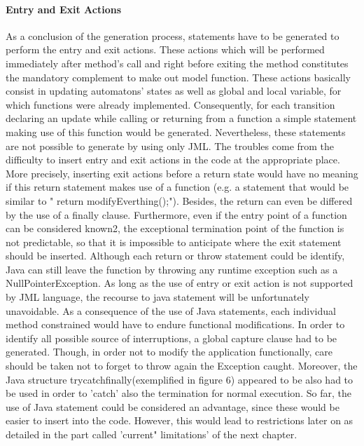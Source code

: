 \paragraph{Entry and Exit Actions}
As a conclusion of the generation process, statements have to be generated to perform the entry and exit actions. These actions which will be performed immediately after method's call and right before exiting the method constitutes the mandatory complement to make out model function. These actions basically consist in updating automatons' states as well as global and local variable, for which functions were already implemented. Consequently, for each transition declaring an update while calling or returning from a function a simple statement making use of this function would be generated. 
Nevertheless, these statements are not possible to generate by using only JML. The troubles come from the difficulty to insert entry and exit actions in the code at the appropriate place. More precisely, inserting exit actions before a return state would have no meaning if this return statement makes use of a function (e.g. a statement that would be similar to " return modifyEverthing();"). Besides, the return can even be differed by the use of a finally clause. Furthermore, even if the entry point of a function can be considered known2, the exceptional termination point of the function is not predictable, so that it is impossible to anticipate where the exit statement should be inserted. Although each return or throw statement could be identify, Java can still leave the function by throwing any runtime exception such as a NullPointerException. As long as the use of entry or exit action is not supported by JML language, the recourse to java statement will be unfortunately unavoidable.
As a consequence of the use of Java statements, each individual method constrained would have to endure functional modifications. In order to identify all possible source of interruptions, a global capture clause had to be generated. Though, in order not to modify the application functionally, care should be taken not to forget to throw again the Exception caught. Moreover, the Java structure try{}catch{}finally{}(exemplified in figure 6) appeared to be also had to be used in order to 'catch' also the termination for normal execution. So far, the use of Java statement could be considered an advantage, since these would be easier to insert into the code. However, this would lead to restrictions later on as detailed in the part called 'current" limitations' of the next chapter.

